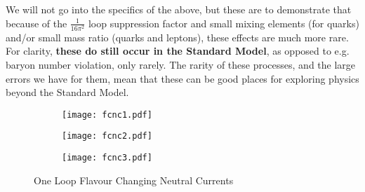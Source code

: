 \documentclass[a4paper, 11pt, normalem]{report}
\begin{document}
We will not go into the specifics of the above, but these are to demonstrate that because of the $\frac{1}{16\pi^2}$ loop suppression factor and small mixing elements (for quarks) and/or small mass ratio (quarks and leptons), these effects are much more rare.
For clarity, \textbf{these do still occur in the Standard Model}, as opposed to e.g. baryon number violation, only rarely.
The rarity of these processes, and the large errors we have for them, mean that these can be good places for exploring physics beyond the Standard Model.
\begin{figure}[H]
    \centering
    \begin{subfigure}[b]{0.3\textwidth}
        \centering
        \texttt{[image: fcnc1.pdf]}
        \caption{}
    \end{subfigure}
    \begin{subfigure}[b]{0.3\textwidth}
        \centering
        \texttt{[image: fcnc2.pdf]}
        \caption{}
    \end{subfigure}
    \begin{subfigure}[b]{0.3\textwidth}
        \centering
        \texttt{[image: fcnc3.pdf]}
        \caption{}
    \end{subfigure}
    \caption{One Loop Flavour Changing Neutral Currents}
\end{figure}
\end{document}
